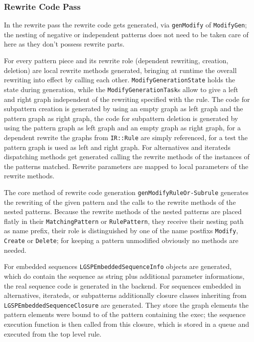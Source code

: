 \subsubsection*{Rewrite Code Pass}
In the rewrite pass the rewrite code gets generated, via \texttt{gen\-Modify} of \texttt{Modify\-Gen};
the nesting of negative or independent patterns does not need to be taken care of here as they don't possess rewrite parts.

For every pattern piece and its rewrite role (dependent rewriting, creation, deletion) are local rewrite methods generated, bringing at runtime the overall rewriting into effect by calling each other.
\texttt{Modify\-Generation\-State} holds the state during generation, while the \texttt{Modify\-Generation\-Task}s allow to give a left and right graph independent of the rewriting specified with the rule. The code for subpattern creation is generated by using an empty graph as left graph and the pattern graph as right graph, the code for subpattern deletion is generated by using the pattern graph as left graph and an empty graph as right graph, for a dependent rewrite the graphs from \texttt{IR::Rule} are simply referenced, for a test the pattern graph is used as left and right graph.
For alternatives and iterateds dispatching methods get generated calling the rewrite methods of the instances of the patterns matched.
Rewrite parameters are mapped to local parameters of the rewrite methods.

The core method of rewrite code generation \texttt{gen\-Modify\-Rule\-Or-Subrule} generates the rewriting of the given pattern and the calls to the rewrite methods of the nested patterns.
Because the rewrite methods of the nested patterns are placed flatly in their \texttt{Matching\-Pattern} or \texttt{Rule\-Pattern}, they receive their nesting path as name prefix, their role is distinguished by one of the name postfixs \texttt{Modify}, \texttt{Create} or \texttt{Delete}; for keeping a pattern unmodified obviously no methods are needed.

For embedded sequences \texttt{LGSPEmbeddedSequenceInfo} objects are generated, which do contain the sequence as string plus additional parameter informations, the real sequence code is generated in the backend.
For sequences embedded in alternatives, iterateds, or subpatterns additionally closure classes inheriting from \texttt{LGSPEmbeddedSequenceClosure} are generated.
They store the graph elements the pattern elements were bound to of the pattern containing the exec; the sequence execution function is then called from this closure, which is stored in a queue and executed from the top level rule.

